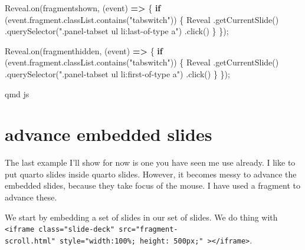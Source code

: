 \documentclass[
  letterpaper,
  DIV=11,
  numbers=noendperiod]{scrreprt}
\newenvironment{Shaded}{\begin{snugshade}}{\end{snugshade}}
\newcommand{\AttributeTok}[1]{\textcolor[rgb]{0.40,0.45,0.13}{#1}}
\newcommand{\BuiltInTok}[1]{\textcolor[rgb]{0.00,0.23,0.31}{#1}}
\newcommand{\ControlFlowTok}[1]{\textcolor[rgb]{0.00,0.23,0.31}{\textbf{#1}}}
\newcommand{\FunctionTok}[1]{\textcolor[rgb]{0.28,0.35,0.67}{#1}}
\newcommand{\KeywordTok}[1]{\textcolor[rgb]{0.00,0.23,0.31}{\textbf{#1}}}
\newcommand{\NormalTok}[1]{\textcolor[rgb]{0.00,0.23,0.31}{#1}}
\newcommand{\OperatorTok}[1]{\textcolor[rgb]{0.37,0.37,0.37}{#1}}
\newcommand{\StringTok}[1]{\textcolor[rgb]{0.13,0.47,0.30}{#1}}
\begin{document}
\begin{Shaded}
\begin{Highlighting}[]
\NormalTok{Reveal}\OperatorTok{.}\FunctionTok{on}\NormalTok{(}\StringTok{\textquotesingle{}fragmentshown\textquotesingle{}}\OperatorTok{,}\NormalTok{ (}\BuiltInTok{event}\NormalTok{) }\KeywordTok{=\textgreater{}}\NormalTok{ \{}
  \ControlFlowTok{if}\NormalTok{ (}\BuiltInTok{event}\OperatorTok{.}\AttributeTok{fragment}\OperatorTok{.}\AttributeTok{classList}\OperatorTok{.}\FunctionTok{contains}\NormalTok{(}\StringTok{"tabswitch"}\NormalTok{)) \{}
\NormalTok{ Reveal}
      \OperatorTok{.}\FunctionTok{getCurrentSlide}\NormalTok{()}
      \OperatorTok{.}\FunctionTok{querySelector}\NormalTok{(}\StringTok{".panel{-}tabset ul li:last{-}of{-}type a"}\NormalTok{)}
      \OperatorTok{.}\FunctionTok{click}\NormalTok{()}
\NormalTok{  \}}
\NormalTok{\})}\OperatorTok{;}

\NormalTok{Reveal}\OperatorTok{.}\FunctionTok{on}\NormalTok{(}\StringTok{\textquotesingle{}fragmenthidden\textquotesingle{}}\OperatorTok{,}\NormalTok{ (}\BuiltInTok{event}\NormalTok{) }\KeywordTok{=\textgreater{}}\NormalTok{ \{}
  \ControlFlowTok{if}\NormalTok{ (}\BuiltInTok{event}\OperatorTok{.}\AttributeTok{fragment}\OperatorTok{.}\AttributeTok{classList}\OperatorTok{.}\FunctionTok{contains}\NormalTok{(}\StringTok{"tabswitch"}\NormalTok{)) \{}
\NormalTok{ Reveal}
      \OperatorTok{.}\FunctionTok{getCurrentSlide}\NormalTok{()}
      \OperatorTok{.}\FunctionTok{querySelector}\NormalTok{(}\StringTok{".panel{-}tabset ul li:first{-}of{-}type a"}\NormalTok{)}
      \OperatorTok{.}\FunctionTok{click}\NormalTok{()}
\NormalTok{  \}}
\NormalTok{\})}\OperatorTok{;}
\end{Highlighting}
\end{Shaded}

qmd js

\section{advance embedded slides}\label{advance-embedded-slides}

The last example I'll show for now is one you have seen me use already.
I like to put quarto slides inside quarto slides. However, it becomes
messy to advance the embedded slides, because they take focus of the
mouse. I have used a fragment to advance these.

We start by embedding a set of slides in our set of slides. We do thing
with
\texttt{\textless{}iframe\ class="slide-deck"\ src="fragment-scroll.html"\ style="width:100\%;\ height:\ 500px;"\ \textgreater{}\textless{}/iframe\textgreater{}}.
\end{document}
